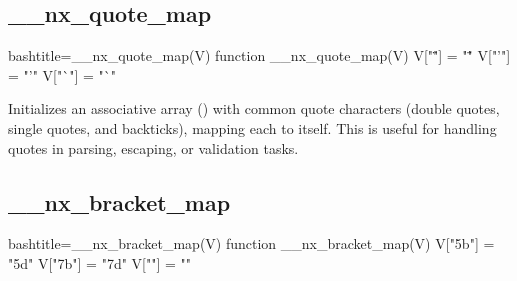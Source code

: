 \subsection{__nx_quote_map}
\label{__nx_quote_map}
\begin{NexCodeBox}{bash}{title={__nx_quote_map(V)}}
	function __nx_quote_map(V) {
		V["\""] = "\""
		V["'"] = "'"
		V["`"] = "`"
	}
\end{NexCodeBox}

\begin{NexMainBox}
	\begin{NexMainBox}
		Initializes an associative array () with common quote characters (double quotes, single quotes, and backticks), mapping each to itself. This is useful for handling quotes in parsing, escaping, or validation tasks.
	\end{NexMainBox}
	\begin{NexMainBox}
		\begin{NexListDark}
		\end{NexListDark}
	\end{NexMainBox}
\end{NexMainBox}

\newpage
\subsection{__nx_bracket_map}
\label{__nx_bracket_map}
\begin{NexCodeBox}{bash}{title={__nx_bracket_map(V)}}
function __nx_bracket_map(V) {
	V["\x5b"] = "\x5d"
	V["\x7b"] = "\x7d"
	V[""] = ""
}
\end{NexCodeBox}

